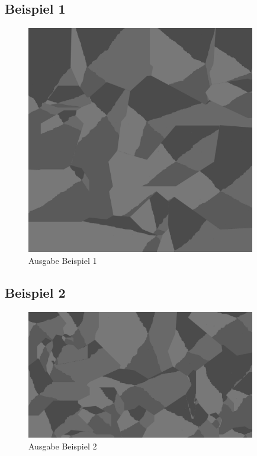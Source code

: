 \documentclass[a4paper,10pt,ngerman]{scrartcl}
\begin{document}
    \subsection{Beispiel 1}
      
      \begin{figure}[H]
        \centering
        \includegraphics[width=10cm]{../beispielausgaben/beispiel1.png}
        \caption{Ausgabe Beispiel 1}
      \end{figure}
    \subsection{Beispiel 2}
      
      \begin{figure}[H]
        \centering
        \includegraphics[width=10cm]{../beispielausgaben/beispiel2.png}
        \caption{Ausgabe Beispiel 2}
      \end{figure}
\end{document}
